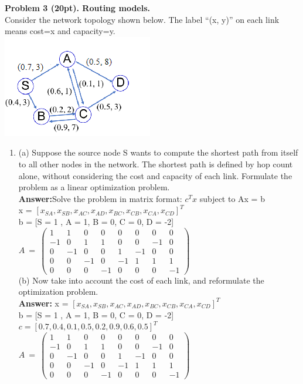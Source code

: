 \documentclass[12pt]{article}
\begin{document}
\noindent \textbf{Problem 3 (20pt). Routing models.\\}
Consider the network topology shown below. The label “(x, y)” on each link means cost=x and capacity=y.\\
\includegraphics[scale=1]{HW4_Q3.png}
\begin{enumerate}
\item (a) Suppose the source node S wants to compute the shortest path from itself to all other nodes in the network. The shortest path is defined by hop count alone, without considering the cost and capacity of each link. Formulate the problem as a linear optimization problem.\\
\textbf{Answer:}Solve the problem in matrix format: $c^Tx$ subject to Ax = b\\
x = $[x_{SA}, x_{SB}, x_{AC}, x_{AD}, x_{BC}, x_{CB}, x_{CA}, x_{CD}]^T$\\
b = [S = 1 , A = 1, B = 0, C = 0, D = -2]\\
$A\:=\:\begin{pmatrix}1&1&0&0&0&0&0&0\\ -1&0&1&1&0&0&-1&0\\ 0&-1&0&0&1&-1&0&0\\ 0&0&-1&0&-1&1&1&1\\ 0&0&0&-1&0&0&0&-1\end{pmatrix}$\\

(b) Now take into account the cost of each link, and reformulate the optimization problem.\\
\textbf{Answer:}
x = $[x_{SA}, x_{SB}, x_{AC}, x_{AD}, x_{BC}, x_{CB}, x_{CA}, x_{CD}]^T$\\
b = [S = 1 , A = 1, B = 0, C = 0, D = -2]\\
$c = [0.7, 0.4, 0.1, 0.5, 0.2, 0.9, 0.6, 0.5]^T$\\
$A\:=\:\begin{pmatrix}1&1&0&0&0&0&0&0\\ -1&0&1&1&0&0&-1&0\\ 0&-1&0&0&1&-1&0&0\\ 0&0&-1&0&-1&1&1&1\\ 0&0&0&-1&0&0&0&-1\end{pmatrix}$\\


\end{enumerate}
\end{document}
